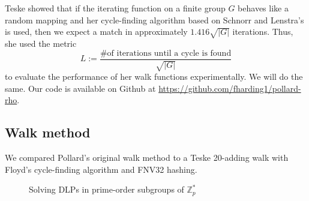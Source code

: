 \documentclass{article}
\newcommand{\ZZ}{\mathbb{Z}}
\begin{document}
Teske showed that if the iterating function on a finite group $G$ behaves like a random mapping and her cycle-finding algorithm based on Schnorr and Lenstra's is used, then we expect a match in approximately $1.416\sqrt{|G|}$ iterations. Thus, she used the metric $$L := \frac{\text{\# of iterations until a cycle is found}}{\sqrt{|G|}}$$ to evaluate the performance of her walk functions experimentally. We will do the same. Our code is available on Github at \href{https://github.com/fharding1/pollard-rho}{https://github.com/fharding1/pollard-rho}.

\subsection{Walk method}

We compared Pollard's original walk method to a Teske 20-adding walk with Floyd's cycle-finding algorithm and FNV32 hashing.

\begin{figure}[H]
\centering
{} \quad
{}
\caption{Solving DLPs in prime-order subgroups of $\ZZ_p^*$}
\end{figure}
\end{document}
